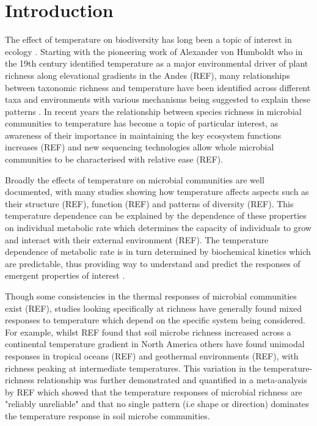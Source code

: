 \documentclass{article}
\begin{document}
\section*{Introduction}

The effect of temperature on biodiversity has long been a topic of interest in ecology \citep{Gaston2000}. Starting with the pioneering work of Alexander von Humboldt who in the 19th century identified temperature as a major environmental driver of plant richness along elevational gradients in the Andes (REF), many relationships between taxonomic richness and temperature have been identified across different taxa and environments with various mechanisms being suggested to explain these patterns \citep{Rohde1992,Gaston2000}. In recent years the relationship between species richness in microbial communities to temperature has become a topic of particular interest, as awareness of their importance in maintaining the key ecosystem functions increases (REF) and new sequencing technologies allow whole microbial communities to be characterised with relative ease (REF).  

Broadly the effects of temperature on microbial communities are well documented, with many studies showing how temperature affects aspects such as their structure (REF), function (REF) and patterns of diversity (REF). This temperature dependence can be explained by the dependence of these properties on individual metabolic rate which determines the capacity of individuals to grow and interact with their external environment (REF). The temperature dependence of metabolic rate is in turn determined by biochemical kinetics which are predictable, thus providing way to understand and predict the responses of emergent properties of interest \cite{Gillooly2001,Brown2004}. 

Though some consistencies in the thermal responses of microbial communities exist (REF), studies looking specifically at richness have generally found mixed responses to temperature which depend on the specific system being considered. For example, whilst REF found that soil microbe richness increased across a continental temperature gradient in North America others have found unimodal responses in tropical oceans (REF) and geothermal environments (REF), with richness peaking at intermediate temperatures. This variation in the temperature-richness relationship was further demonstrated and quantified in a meta-analysis by REF which showed that the temperature responses of microbial richness are "reliably unreliable" and that no single pattern (i.e shape or direction) dominates the temperature response in soil microbe communities. 
\end{document}
